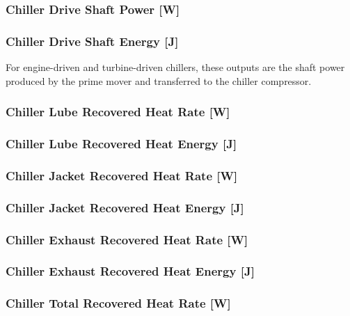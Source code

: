 \subsubsection{Chiller Drive Shaft Power {[}W{]}}\label{chiller-drive-shaft-power-w}

\subsubsection{Chiller Drive Shaft Energy {[}J{]}}\label{chiller-drive-shaft-energy-j}

For engine-driven and turbine-driven chillers, these outputs are the shaft power produced by the prime mover and transferred to the chiller compressor.

\subsubsection{Chiller Lube Recovered Heat Rate {[}W{]}}\label{chiller-lube-recovered-heat-rate-w}

\subsubsection{Chiller Lube Recovered Heat Energy {[}J{]}}\label{chiller-lube-recovered-heat-energy-j}

\subsubsection{Chiller Jacket Recovered Heat Rate {[}W{]}}\label{chiller-jacket-recovered-heat-rate-w}

\subsubsection{Chiller Jacket Recovered Heat Energy {[}J{]}}\label{chiller-jacket-recovered-heat-energy-j}

\subsubsection{Chiller Exhaust Recovered Heat Rate {[}W{]}}\label{chiller-exhaust-recovered-heat-rate-w}

\subsubsection{Chiller Exhaust Recovered Heat Energy {[}J{]}}\label{chiller-exhaust-recovered-heat-energy-j}

\subsubsection{Chiller Total Recovered Heat Rate {[}W{]}}\label{chiller-total-recovered-heat-rate-w}

